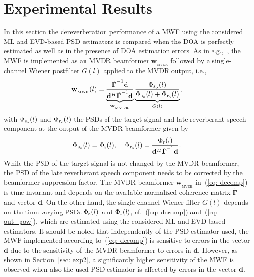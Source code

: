 \documentclass{article}
\begin{document}
\section{Experimental Results}
\label{sec: exp}
In this section the dereverberation performance of a MWF using the considered ML and EVD-based PSD estimators is compared when the DOA is perfectly estimated as well as in the presence of DOA estimation errors.
As in e.g.,~\cite{Braun_EUSIPCO_2013,Kuklasinski_EUSIPCO_2014g}, the MWF is implemented as an MVDR beamformer ${\mathbf{w}_{_{\text{MVDR}}}}$ followed by a single-channel Wiener postfilter $G(l)$ applied to the MVDR output, i.e.,
\begin{equation}
\label{eq: decomp}
\mathbf{w}_{_{\text{MWF}}}(l) = \underbrace{\frac{\tilde{\boldsymbol{{\Gamma}}}^{-1}\mathbf{d}}{\mathbf{d}^H\tilde{\boldsymbol{{\Gamma}}}^{-1}\mathbf{d}}}_{\mathbf{w}_{_{\text{MVDR}}}} \underbrace{\frac{\Phi_{\rm s_o}(l)}{\Phi_{\rm s_o}(l) + \Phi_{\rm r_o}(l)}}_{G(l)},
\end{equation}
with $\Phi_{\rm s_o}(l)$ and $\Phi_{\rm r_o}(l)$ the PSDs of the target signal and late reverberant speech component at the output of the MVDR beamformer given by
\begin{equation}
\label{eq: out_pow}
\Phi_{\rm s_o}(l) = \Phi_{\rm s}(l), \; \; \; \; \Phi_{\rm r_o}(l) = \frac{\Phi_{\rm r}(l)}{\mathbf{d}^H\tilde{\boldsymbol{\Gamma}}^{-1}\mathbf{d}}.
\end{equation}
While the PSD of the target signal is not changed by the MVDR beamformer, the PSD of the late reverberant speech component needs to be corrected by the beamformer suppression factor.
The MVDR beamformer $\mathbf{w}_{_{\text{MVDR}}}$ in~(\ref{eq: decomp}) is time-invariant and depends on the available normalized coherence matrix $\tilde{\boldsymbol{\Gamma}}$ and vector $\mathbf{d}$.
On the other hand, the single-channel Wiener filter $G(l)$ depends on the time-varying PSDs $\Phi_{\rm s}(l)$ and $\Phi_{\rm r}(l)$, cf.~(\ref{eq: decomp}) and~(\ref{eq: out_pow}), which are estimated using the considered ML and EVD-based estimators.
It should be noted that independently of the PSD estimator used, the MWF implemented according to~(\ref{eq: decomp}) is sensitive to errors in the vector $\mathbf{d}$ due to the sensitivity of the MVDR beamformer to errors in $\mathbf{d}$.
However, as shown in Section~\ref{sec: exp2}, a significantly higher sensitivity of the MWF is observed when also the used PSD estimator is affected by errors in the vector $\mathbf{d}$.
\end{document}
